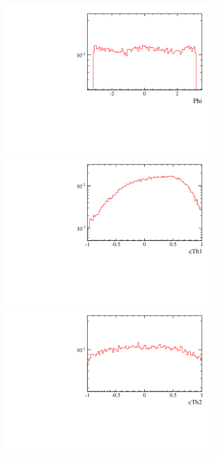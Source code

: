 \begin{figure} [htb!]
\begin{center}
\includegraphics[scale=0.20]{figs/logPhiFULL2pipi.pdf}
\includegraphics[scale=0.20]{figs/logcTh1FULL2pipi.pdf}
\includegraphics[scale=0.20]{figs/logcTh2FULL2pipi.pdf}

\end{center}
\end{figure}
